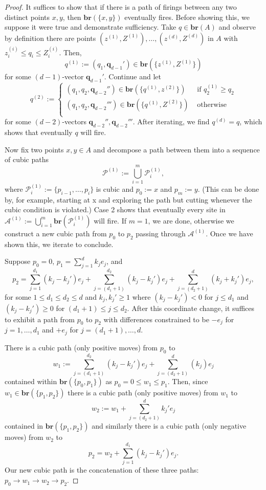 \documentclass[aap]{imsart}
\newcommand{\br}{\mathbf{br}}  %
\begin{document}
\begin{proof}
	It suffices to show that if there is a path of firings between any two distinct points $x,y$, 
	then $\br(\{x,y\})$ eventually fires. Before showing this, we suppose it were true and demonstrate sufficiency.
	Take $q \in \br(A)$ and observe by definition there are points $(z^{(1)}, Z^{(1)}), \ldots, (z^{(d)}, Z^{(d)})$ in $A$
	with $z_i^{(i)} \leq q_i \leq Z_i^{(i)}$.  Then,
	\[
	q^{(1)} := (q_1, \mathbf{q}_{d-1}') \in \br(\{z^{(1)}, Z^{(1)}\})
	\]
	for some $(d-1)$-vector $\mathbf{q}_{d-1}'$. Continue and let 
	\[
	q^{(2)} := \begin{cases}
	(q_1, q_2, \mathbf{q}_{d-2}'')  \in \br(\{q^{(1)}, z^{(2)}\}) &\mbox{ if $q^{(1)}_2 \geq q_2$}\\
	(q_1,q_2, \mathbf{q}_{d-2}''')  \in \br(\{q^{(1)}, Z^{(2)}\}) &\mbox{ otherwise }\\
	\end{cases}	
	\]
	for some $(d-2)$-vectors $\mathbf{q}_{d-2}'', \mathbf{q}_{d-2}'''$. After iterating, we find $q^{(d)} = q$, which shows that eventually $q$ will fire.
	
	
	Now fix two points $x,y \in A$ and decompose
	a path between them into a sequence of cubic paths
	\[
	\mathcal{P}^{(1)} := \bigcup_{i=1}^m \mathcal{P}^{(1)}_i, 
	\]
	where $\mathcal{P}^{(1)}_i := \{p_{i-1}, \ldots, p_i \}$ is cubic and $p_0 := x$ and $p_{m} := y$. (This can be done by, for example, 
	starting at x and exploring the path but cutting whenever the cubic condition is violated.) Case 2 shows that eventually every site in $\mathcal{A}^{(1)} := \bigcup_{i=1}^m \br(\mathcal{P}^{(1)}_i)$ will fire. 
	If $m = 1$, we are done, otherwise we construct a new cubic path from $p_0$ to $p_2$ 
	passing through $\mathcal{A}^{(1)}$. Once we have shown this, we
	iterate to conclude. 
	
	
	Suppose $p_0 = 0$, $p_{1} = \sum_{j=1}^d k_j e_j$, and 
	\[
	p_{2} = \sum_{j=1}^{d_1} (k_j-k_j') e_j  + \sum_{j=(d_1+1)}^{d_2} (k_j - k_j') e_j + \sum_{j=(d_2+1)}^{d} (k_j+k_j') e_j,
	\]
	for some $1 \leq d_1 \leq d_2 \leq d$ and $k_j,k_j' \geq 1$ where $(k_j - k_j') < 0$ for $j \leq d_1$ and $(k_j - k_j') \geq 0$
	for $(d_1 + 1) \leq j \leq d_2$. After this coordinate change, it suffices to exhibit a path from $p_0$ to $p_2$ with differences constrained to be $-e_j$ for $j = 1, \ldots, d_1$ and 
	$+e_j$ for $j = (d_1 + 1), \ldots, d$.
	
	There is a cubic path (only positive moves) from $p_0$ to
	\[
	w_1 := \sum_{j=(d_1+1)}^{d_2} (k_j - k_j') e_j + \sum_{j=(d_2+1)}^{d} (k_j) e_j
	\]
	contained within $\br(\{p_0, p_1\})$ as $p_0 = 0 \leq w_1 \leq p_1$. Then, since $w_1 \in \br(\{p_1,p_2\})$ there is a cubic path (only positive moves) from $w_1$ to 
	\[
	w_2 := w_1 + \sum_{j=(d_2+1)}^{d} k_j'e_j
	\]
	contained in $\br(\{p_1, p_2\})$ and similarly there is a cubic path (only negative moves) from $w_2$ to 
	\[
	p_2 = w_2  + \sum_{j=1}^{d_1} (k_j-k_j') e_j.
	\]
	Our new cubic path is the concatenation of these three paths: $p_0 \to w_1  \to w_2 \to p_2$. 
\end{proof}
\end{document}
